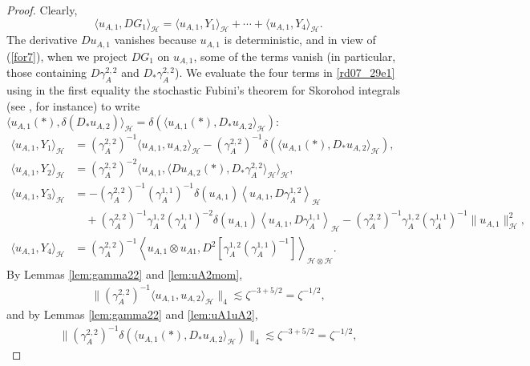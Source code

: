 \documentclass[12pt,a4paper]{article}
\newcommand{\HH}{\mathcal{H}}
\newcommand {\deltah}{{\zeta}}
\newcommand{\<}{\langle}
\renewcommand{\>}{\rangle}
\begin{document}
\begin{proof}
 Clearly,
\begin{equation}\label{rd07_29e1}
   \langle u_{A,1}, DG_1\rangle_\HH = \langle u_{A, 1}, Y_1 \rangle_\HH + \cdots + \langle u_{A, 1}, Y_4 \rangle_\HH.
\end{equation}
The derivative $D u_{A, 1}$ vanishes because $u_{A, 1}$ is deterministic, and in view of  (\ref{for7}),  when we project $DG_1$ on $u_{A,1}$, some of the terms vanish (in particular, those containing $D\gamma_A^{2,2}$ and $D_*\gamma_A^{2,2} $). 
We evaluate the four terms in \eqref{rd07_29e1} using in the first equality the stochastic Fubini's theorem for Skorohod integrals (see \cite[Proposition 6.5]{KRT}, for instance) to write $\langle u_{A, 1}(*), \delta(D_* u_{A, 2}) \rangle_\HH =  \delta(\langle u_{A,1}(*), D_{*}u_{A,2}\rangle_{\HH}  )$: 
\begin{align*}
    \langle u_{A,1}, Y_1\rangle_\HH&=   (\gamma_{A} ^{2,2})^{-1}  \langle u_{A,1}, u_{A,2} \rangle_\HH 
     -(\gamma_A^{2,2})^{-1} \delta(\langle u_{A,1}(*), D_{*}u_{A,2}\rangle_{\HH}  ) ,\\[6pt]
\langle u_{A, 1}, Y_2 \rangle_\HH & =(\gamma_A^{2,2})^{-2}\langle u_{A,1}, \langle Du_{A,2}(*), D_*\gamma_A^{2,2}\rangle_\HH\rangle_\HH, \\[6pt]
   \langle u_{A, 1}, Y_3 \rangle_\HH &=  -(\gamma_{A} ^{2,2})^{-1} 
     ( \gamma_{A} ^{1,1})^{-1}\delta(u_{A,1} )  \left\langle u_{A,1},  D\gamma_{A} ^{1,2} \right\rangle_\HH\\
     &\quad+ ( \gamma_{A} ^{2,2})^{-1}\gamma_{A} ^{1,2}( \gamma_{A} ^{1,1})^{-2}  \delta(u_{A,1} ) \left\langle u_{A,1}, D\gamma_A^{1,1} \right\rangle_\HH 
      -(\gamma_{A} ^{2,2})^{-1}   \gamma_{A} ^{1,2}
     ( \gamma_{A} ^{1,1})^{-1} \|u_{A,1} \|^2_\HH, \\[6pt]
    \langle u_{A, 1}, Y_4 \rangle_\HH   &= (\gamma_{A} ^{2,2})^{-1} \left \langle u_{A,1}\otimes u_{A1} ,D^2[  \gamma_{A} ^{1,2}
     ( \gamma_{A} ^{1,1})^{-1} ] \right\rangle_{\HH\otimes \HH} .
  \end{align*}
 By Lemmas \ref{lem:gamma22} and \ref{lem:uA2mom},
         \begin{align*}
         \|   (\gamma_{A} ^{2,2})^{-1}  \langle u_{A,1}, u_{A,2} \rangle_\HH\|_4\lesssim \deltah^{-3+5/2}=\deltah^{-1/2},
         \end{align*}
and by Lemmas \ref{lem:gamma22} and \ref{lem:uA1uA2},
         \begin{align*}
         \|(\gamma_A^{2,2})^{-1}\delta(\langle u_{A,1}(*), D_{*}u_{A,2}\rangle_{\HH})\|_4\lesssim \deltah^{-3+5/2}=\deltah^{-1/2},

\end{align*}
\end{proof}
\end{document}
